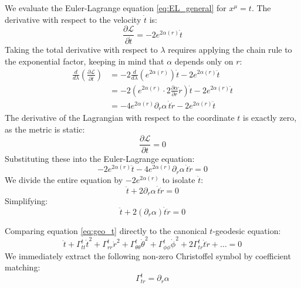 \documentclass[11pt, a4paper]{report}
\begin{document}
We evaluate the Euler-Lagrange equation \eqref{eq:EL_general} for $x^\mu = t$. 
The derivative with respect to the velocity $\dot{t}$ is:
\begin{equation}
    \frac{\partial \mathcal{L}}{\partial \dot{t}} = -2e^{2\alpha(r)} \dot{t}
\end{equation}
Taking the total derivative with respect to $\lambda$ requires applying the chain rule to the exponential factor, keeping in mind that $\alpha$ depends only on $r$:
\begin{align}
    \frac{d}{d\lambda} \left( \frac{\partial \mathcal{L}}{\partial \dot{t}} \right) &= -2 \frac{d}{d\lambda} \left( e^{2\alpha(r)} \right) \dot{t} - 2e^{2\alpha(r)} \ddot{t} \nonumber \\
    &= -2 \left( e^{2\alpha(r)} \cdot 2 \frac{\partial \alpha}{\partial r} \dot{r} \right) \dot{t} - 2e^{2\alpha(r)} \ddot{t} \nonumber \\
    &= -4e^{2\alpha(r)} \partial_r \alpha \, \dot{t}\dot{r} - 2e^{2\alpha(r)} \ddot{t}
\end{align}
The derivative of the Lagrangian with respect to the coordinate $t$ is exactly zero, as the metric is static:
\begin{equation}
    \frac{\partial \mathcal{L}}{\partial t} = 0
\end{equation}
Substituting these into the Euler-Lagrange equation:
\begin{equation}
    -2e^{2\alpha(r)} \ddot{t} - 4e^{2\alpha(r)} \partial_r \alpha \, \dot{t}\dot{r} = 0
\end{equation}
We divide the entire equation by $-2e^{2\alpha(r)}$ to isolate $\ddot{t}$:
\begin{equation}
    \ddot{t} + 2\partial_r \alpha \, \dot{t}\dot{r} = 0
\end{equation}
Simplifying:
\begin{equation}
    \ddot{t} + 2 (\partial_r \alpha) \dot{t}\dot{r} = 0 \label{eq:geo_t}
\end{equation}

Comparing equation \eqref{eq:geo_t} directly to the canonical $t$-geodesic equation:
\begin{equation}
    \ddot{t} + \Gamma^t_{tt}\dot{t}^2 + \Gamma^t_{rr}\dot{r}^2 + \Gamma^t_{\theta\theta}\dot{\theta}^2 + \Gamma^t_{\phi\phi}\dot{\phi}^2 + 2\Gamma^t_{tr}\dot{t}\dot{r} + \dots = 0
\end{equation}
We immediately extract the following non-zero Christoffel symbol by coefficient matching:
\begin{equation}
    \Gamma^t_{tr} = \partial_r \alpha
\end{equation}
\end{document}
